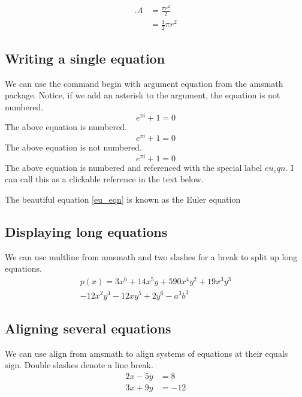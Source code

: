 \documentclass{article}
\begin{document}
\begin{equation}
\begin{split}. %
A & = \frac{\pi r^2}{2} \\
 & = \frac{1}{2} \pi r^2
\end{split}
\end{equation}

\subsection{Writing a single equation}
We can use the command begin with argument equation from the amsmath package.  Notice, if we add an asterisk to the argument, the equation is not numbered.
\begin{equation}
e^{\pi i} + 1 = 0
\end{equation}
The above equation is numbered.
\begin{equation*}
e^{\pi i} + 1 = 0
\end{equation*}
The above equation is not numbered.
\begin{equation} \label{eu_eqn}
e^{\pi i} + 1 = 0
\end{equation}
The above equation is numbered and referenced with the special label $eu_eqn$.  I can call this as a clickable reference in the text below.

The beautiful equation \ref{eu_eqn} is known as the Euler equation

\subsection{Displaying long equations}
We can use multline from amsmath and two slashes for a break to split up long equations.
\begin{multline*}
p(x) = 3x^6 + 14x^5y + 590x^4y^2 + 19x^3y^3 \\  %
- 12x^2y^4 - 12xy^5 + 2y^6 - a^3b^3
\end{multline*}


\subsection{Aligning several equations}
We can use align from amsmath to align systems of equations at their equals sign.  Double slashes denote a line break.
\begin{align*}
2x - 5y &=  8 \\
3x + 9y &=  -12
\end{align*}
\end{document}

